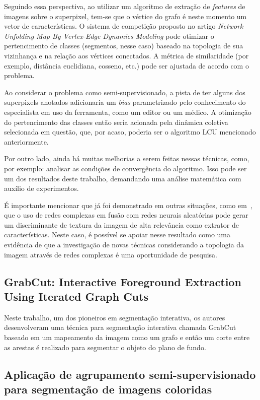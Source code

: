 Seguindo essa perspectiva, ao utilizar um algoritmo de extração de
\textit{features} de imagens sobre o superpixel, tem-se que o vértice
do grafo é neste momento um vetor de características. O sistema de
competição proposto no artigo \textit{Network Unfolding Map By
Vertex-Edge Dynamics Modeling} pode otimizar o pertencimento de
classes (segmentos, nesse caso) baseado na topologia de sua vizinhança
e na relação aos vértices conectados. A métrica de similaridade
(por exemplo, distância euclidiana, cosseno, etc.) pode ser
ajustada de acordo com o problema.

Ao considerar o problema como semi-supervisionado, a pista de ter
alguns dos superpixels anotados adicionaria um \textit{bias}
parametrizado pelo conhecimento do especialista em uso da ferramenta,
como um editor ou um médico. A otimização do pertencimento das classes
então seria acionada pela dinâmica coletiva selecionada em questão,
que, por acaso, poderia ser o algoritmo \gls{LCU} mencionado anteriormente.

Por outro lado, ainda há muitas melhorias a serem feitas nessas técnicas, como,
por exemplo: analisar as condições de convergência do algoritmo. Isso
pode ser um dos resultados deste trabalho, demandando uma análise
matemática com auxílio de experimentos.

É importante mencionar que já foi demonstrado em outras situações,
como em~\cite{JarbasComplexNetworks2020}, que o uso de redes complexas
em fusão com redes neurais aleatórias pode gerar um discriminante de
textura da imagem de alta relevância como extrator de
características. Neste caso, é possível se apoiar nesse resultado como
uma evidência de que a investigação de novas técnicas considerando a
topologia da imagem através de redes complexas é uma oportunidade de
pesquisa.


\subsection{GrabCut: Interactive Foreground Extraction Using Iterated
  Graph Cuts}\label{sec:grabcut}

Neste trabalho, um dos pioneiros em segmentação interativa, os
autores~\cite{rother2004grabcut} desenvolveram uma técnica para segmentação interativa
chamada GrabCut baseado em um mapeamento da imagem como um grafo e
então um corte entre as arestas é realizado para segmentar o objeto do
plano de fundo.


\subsection{Aplicação de agrupamento semi-supervisionado para segmentação
  de imagens coloridas}\label{sec:franciscolira2018}

